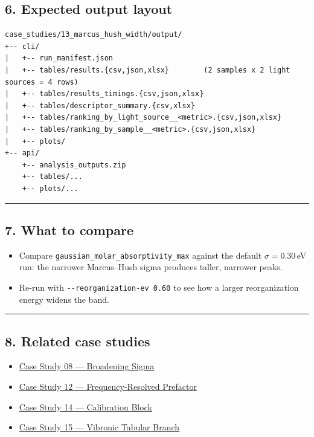 \documentclass[
  11pt,
]{article}
\providecommand{\tightlist}{
  \setlength{\itemsep}{0pt}\setlength{\parskip}{0pt}}
\begin{document}
\hypertarget{6-expected-output-layout}{
\subsection{6. Expected output layout}\label{6-expected-output-layout}}

\begin{verbatim}
case_studies/13_marcus_hush_width/output/
+-- cli/
|   +-- run_manifest.json
|   +-- tables/results.{csv,json,xlsx}        (2 samples x 2 light sources = 4 rows)
|   +-- tables/results_timings.{csv,json,xlsx}
|   +-- tables/descriptor_summary.{csv,xlsx}
|   +-- tables/ranking_by_light_source__<metric>.{csv,json,xlsx}
|   +-- tables/ranking_by_sample__<metric>.{csv,json,xlsx}
|   +-- plots/
+-- api/
    +-- analysis_outputs.zip
    +-- tables/...
    +-- plots/...
\end{verbatim}

\begin{center}\rule{0.5\linewidth}{0.5pt}\end{center}

\hypertarget{7-what-to-compare}{
\subsection{7. What to compare}\label{7-what-to-compare}}

\begin{itemize}
\tightlist
\item
  Compare \texttt{gaussian\_molar\_absorptivity\_max} against the
  default \(\sigma = 0.30\)\,eV run: the narrower Marcus--Hush sigma
  produces taller, narrower peaks.
\item
  Re-run with \texttt{-{}-reorganization-ev 0.60} to see how a larger
  reorganization energy widens the band.
\end{itemize}

\begin{center}\rule{0.5\linewidth}{0.5pt}\end{center}

\hypertarget{8-related-case-studies}{
\subsection{8. Related case studies}\label{8-related-case-studies}}

\begin{itemize}
\tightlist
\item
  \href{https://github.com/pinarsyt/overlap-calculator/blob/main/case_studies/08_broadening_sigma/README.md}{Case
  Study 08 --- Broadening Sigma}
\item
  \href{https://github.com/pinarsyt/overlap-calculator/blob/main/case_studies/12_frequency_resolved_prefactor/README.md}{Case
  Study 12 --- Frequency-Resolved Prefactor}
\item
  \href{https://github.com/pinarsyt/overlap-calculator/blob/main/case_studies/14_calibration_block/README.md}{Case
  Study 14 --- Calibration Block}
\item
  \href{https://github.com/pinarsyt/overlap-calculator/blob/main/case_studies/15_vibronic_tabular_branch/README.md}{Case
  Study 15 --- Vibronic Tabular Branch}
\end{itemize}
\end{document}
